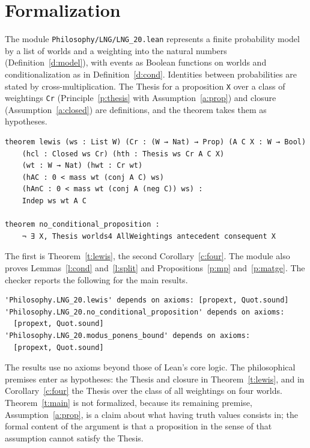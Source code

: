 \documentclass{situationist-preprint}
\begin{document}
\section{Formalization}\label{s:formal}

The module \nolinkurl{Philosophy/LNG/LNG_20.lean} represents a finite probability model by a list of worlds and a weighting into the natural numbers (Definition~\ref{d:model}), with events as Boolean functions on worlds and conditionalization as in Definition~\ref{d:cond}. Identities between probabilities are stated by cross-multiplication. The Thesis for a proposition \texttt{X} over a class of weightings \texttt{Cr} (Principle~\ref{p:thesis} with Assumption~\ref{a:prop}) and closure (Assumption~\ref{a:closed}) are definitions, and the theorem takes them as hypotheses.

\begin{lstlisting}
theorem lewis (ws : List W) (Cr : (W → Nat) → Prop) (A C X : W → Bool)
    (hcl : Closed ws Cr) (hth : Thesis ws Cr A C X)
    (wt : W → Nat) (hwt : Cr wt)
    (hAC : 0 < mass wt (conj A C) ws)
    (hAnC : 0 < mass wt (conj A (neg C)) ws) :
    Indep ws wt A C

theorem no_conditional_proposition :
    ¬ ∃ X, Thesis worlds4 AllWeightings antecedent consequent X
\end{lstlisting}

The first is Theorem~\ref{t:lewis}, the second Corollary~\ref{c:four}. The module also proves Lemmas~\ref{l:cond} and~\ref{l:split} and Propositions~\ref{p:mp} and~\ref{p:matge}. The checker reports the following for the main results.

\begin{lstlisting}
'Philosophy.LNG_20.lewis' depends on axioms: [propext, Quot.sound]
'Philosophy.LNG_20.no_conditional_proposition' depends on axioms:
  [propext, Quot.sound]
'Philosophy.LNG_20.modus_ponens_bound' depends on axioms:
  [propext, Quot.sound]
\end{lstlisting}

The results use no axioms beyond those of Lean's core logic. The philosophical premises enter as hypotheses: the Thesis and closure in Theorem~\ref{t:lewis}, and in Corollary~\ref{c:four} the Thesis over the class of all weightings on four worlds. Theorem~\ref{t:main} is not formalized, because its remaining premise, Assumption~\ref{a:prop}, is a claim about what having truth values consists in; the formal content of the argument is that a proposition in the sense of that assumption cannot satisfy the Thesis.
\end{document}
